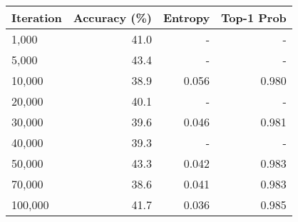 \begin{tabular}{lrrr}
\toprule
Iteration & Accuracy (\%) & Entropy & Top-1 Prob \\
\midrule
    1,000 &          41.0 &       - &          - \\
    5,000 &          43.4 &       - &          - \\
   10,000 &          38.9 &   0.056 &      0.980 \\
   20,000 &          40.1 &       - &          - \\
   30,000 &          39.6 &   0.046 &      0.981 \\
   40,000 &          39.3 &       - &          - \\
   50,000 &          43.3 &   0.042 &      0.983 \\
   70,000 &          38.6 &   0.041 &      0.983 \\
  100,000 &          41.7 &   0.036 &      0.985 \\
\bottomrule
\end{tabular}
